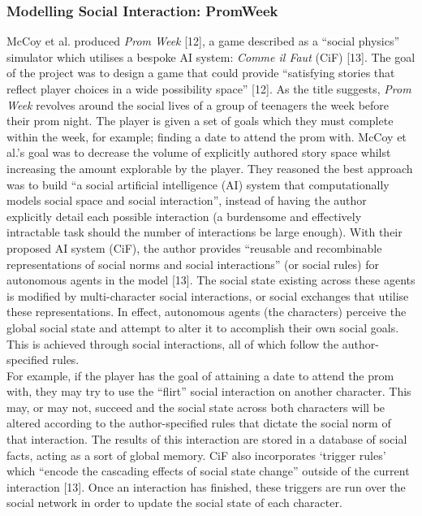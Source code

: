 \documentclass{sig-alternate-05-2015}
\begin{document}
\subsubsection{Modelling Social Interaction: PromWeek}

\newline McCoy et al. produced \textit{Prom Week} [12], a game described as a ``social physics'' simulator which utilises a bespoke AI system: \textit{Comme il Faut} (CiF) [13]. The goal of the project was to design a game that could provide ``satisfying stories that reflect player choices in a wide possibility space'' [12].
As the title suggests, \textit{Prom Week} revolves around the social lives of a group of teenagers the week before their prom night. The player is given a set of goals which they must complete within the week, for example; finding a date to attend the prom with. McCoy et al.'s goal was to decrease the volume of explicitly authored story space whilst increasing the amount explorable by the player. They reasoned the best approach was to build ``a social artificial intelligence (AI) system that computationally models social space and social interaction'', instead of having the author explicitly detail each possible interaction (a burdensome and effectively intractable task should the number of interactions be large enough). With their proposed AI system (CiF),  the author provides ``reusable and recombinable representations of social norms and social interactions'' (or social rules) for autonomous agents in the model [13]. The social state existing across these agents is modified by multi-character social interactions, or social exchanges that utilise these representations. In effect, autonomous agents (the characters) perceive the global social state and attempt to alter it to accomplish their own social goals. This is achieved through social interactions, all of which follow the author-specified rules.\\

For example, if the player has the goal of attaining a date to attend the prom with, they may try to use the ``flirt'' social interaction on another character. This may, or may not, succeed and the social state across both characters will be altered according to the author-specified rules that dictate the social norm of that interaction. The results of this interaction are stored in a database of social facts, acting as a sort of global memory. CiF also incorporates `trigger rules' which ``encode the cascading effects of social state change'' outside of the current interaction [13]. Once an interaction has finished, these triggers are run over the social network in order to update the social state of each character.
\end{document}
